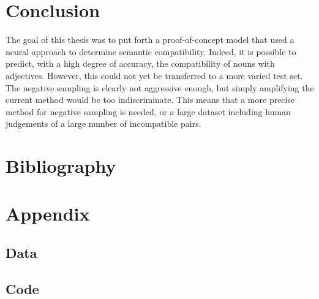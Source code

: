 \documentclass[a4paper, 11pt]{scrartcl}
\begin{document}
\section{Conclusion}
The goal of this thesis was to put forth a proof-of-concept model that used a neural approach to determine semantic compatibility. Indeed, it is possible to predict, with a high degree of accuracy, the compatibility of nouns with adjectives. However, this could not yet be transferred to a more varied test set. The negative sampling is clearly not aggressive enough, but simply amplifying the current method would be too indiscriminate. This means that a more precise method for negative sampling is needed, or a large dataset including human judgements of a large number of incompatible pairs.

\clearpage
\section{Bibliography}


\printbibliography                      %

\section{Appendix}

\subsection{Data}

\subsection{Code}
\end{document}
